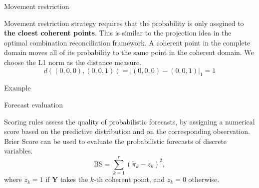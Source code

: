 \documentclass[12pt]{beamer}
\begin{document}
\begin{frame}{Movement restriction}

\begin{outline}
\0 Movement restriction strategy requires that the probability is only assgined to \textbf{the cloest coherent points}.
\1 This is similar to the projection idea in the optimal combination reconciliation framework.    
\1 A coherent point in the complete domain moves all of its probability to the same point in the coherent domain.
\1 We choose the L1 norm as the distance measure.
\[
    d((0, 0, 0), (0, 0, 1)) = |(0,0,0) - (0,0,1)|_1 = 1  
\]
\end{outline}
\vspace{-3mm}
\begin{block}{Example}\end{block}
\end{frame}


\begin{frame}{Forecast evaluation}

    \begin{outline}
        \1 Scoring rules assess the quality of probabilistic forecasts, by assigning a numerical score based on the predictive distribution and on the corresponding observation.
        \1 Brier Score can be used to evaluate the probabilistic forecasts of discrete variables.
        \[
          \text{BS} = \sum_{k=1}^r (\tilde{\pi}_k - {z}_k)^2,
        \]
        where $z_k = 1$ if $\mathbf{Y}$ takes the $k$-th coherent point, and $z_k = 0$ otherwise.
    \end{outline}
\end{frame}
\end{document}
